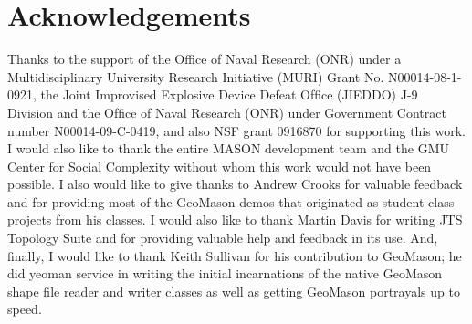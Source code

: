 \documentclass[twoside,10pt]{book}
\begin{document}
\cleardoublepage %
\chapter*{Acknowledgements} %
\thispagestyle{empty} %

Thanks to the support of the Office of Naval Research (ONR) under a
Multidisciplinary University Research Initiative (MURI) Grant
No. N00014-08-1-0921, the Joint Improvised Explosive Device Defeat
Ofﬁce (JIEDDO) J-9 Division and the Ofﬁce of Naval Research (ONR)
under Government Contract number N00014-09-C-0419, and also NSF grant
0916870 for supporting this work. I would also like to thank the
entire MASON development team and the GMU Center for Social Complexity
without whom this work would not have been possible.  I also would
like to give thanks to Andrew Crooks for valuable feedback and for
providing most of the GeoMason demos that originated as student class
projects from his classes.  I would also like to thank Martin Davis
for writing JTS Topology Suite and for providing valuable help and
feedback in its use.  And, finally, I would like to thank Keith
Sullivan for his contribution to GeoMason; he did yeoman service in
writing the initial incarnations of the native GeoMason shape file
reader and writer classes as well as getting GeoMason portrayals up to
speed.


\cleardoublepage
\footnotesize
{}
\printindex
\end{document}

